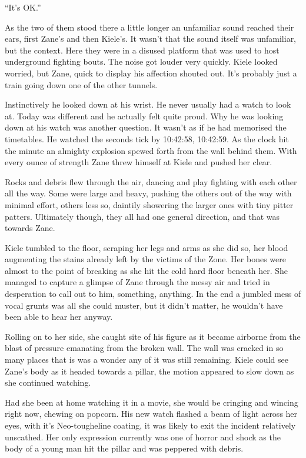 ``It's OK.''

As the two of them stood there a little longer an unfamiliar sound reached their ears, first Zane's and then Kiele's.  It wasn't that the sound itself was unfamiliar, but the context.  Here they were in a disused platform that was used to host underground fighting bouts.    The noise got louder very quickly.  Kiele looked worried, but Zane, quick to display his affection shouted out.  It's probably just a train going down one of the other tunnels.

Instinctively he looked down at his wrist.  He never usually had a watch to look at.  Today was different and he actually felt quite proud.  Why he was looking down at his watch was another question.  It wasn't as if he had memorised the timetables.  He watched the seconds tick by 10:42:58, 10:42:59.  As the clock hit the minute an almighty explosion spewed forth from the wall behind them.  With every ounce of strength Zane threw himself at Kiele and pushed her clear.  

Rocks and debris flew through the air, dancing and play fighting with each other all the way.  Some were large and heavy, pushing the others out of the way with minimal effort, others less so, daintily showering the larger ones with tiny pitter patters.  Ultimately though, they all had one general direction, and that was towards Zane.

Kiele tumbled to the floor, scraping her legs and arms as she did so, her blood augmenting the stains already left by the victims of the Zone.  Her bones were almost to the point of breaking as she hit the cold hard floor beneath her.  She managed to capture a glimpse of Zane through the messy air and tried in desperation to call out to him, something, anything.  In the end a jumbled mess of vocal grunts was all she could muster, but it didn't matter, he wouldn't have been able to hear her anyway.

Rolling on to her side, she caught site of his figure as it became airborne from the blast of pressure emanating from the broken wall.  The wall was cracked in so many places that is was a wonder any of it was still remaining.  Kiele could see Zane's body as it headed towards a pillar, the motion appeared to slow down as she continued watching.  

Had she been at home watching it in a movie, she would be cringing and wincing right now, chewing on popcorn.  His new watch flashed a beam of light across her eyes, with it's Neo-tougheline coating, it was likely to exit the incident relatively unscathed. Her only expression currently was one of horror and shock as the body of a young man hit the pillar and was peppered with debris.  

